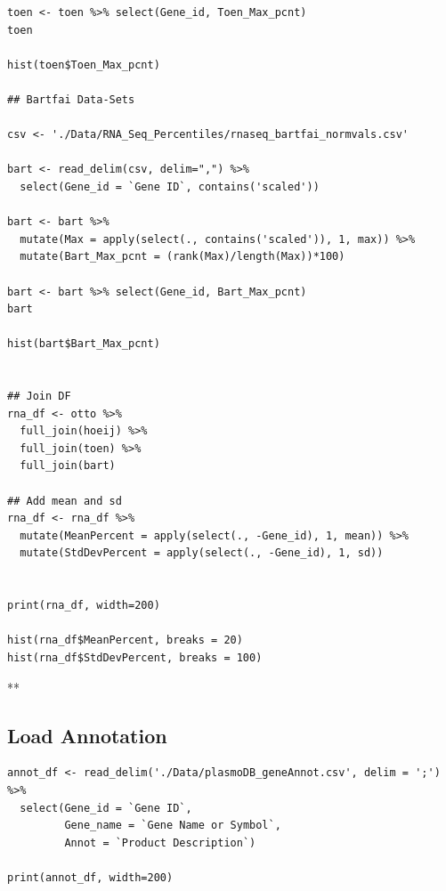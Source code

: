 \documentclass[11pt]{article}
\begin{document}
\begin{verbatim}
toen <- toen %>% select(Gene_id, Toen_Max_pcnt)
toen

hist(toen$Toen_Max_pcnt)

## Bartfai Data-Sets

csv <- './Data/RNA_Seq_Percentiles/rnaseq_bartfai_normvals.csv'

bart <- read_delim(csv, delim=",") %>%
  select(Gene_id = `Gene ID`, contains('scaled'))

bart <- bart %>%
  mutate(Max = apply(select(., contains('scaled')), 1, max)) %>%
  mutate(Bart_Max_pcnt = (rank(Max)/length(Max))*100)

bart <- bart %>% select(Gene_id, Bart_Max_pcnt)
bart

hist(bart$Bart_Max_pcnt)


## Join DF
rna_df <- otto %>%
  full_join(hoeij) %>%
  full_join(toen) %>%
  full_join(bart)

## Add mean and sd
rna_df <- rna_df %>%
  mutate(MeanPercent = apply(select(., -Gene_id), 1, mean)) %>%
  mutate(StdDevPercent = apply(select(., -Gene_id), 1, sd))


print(rna_df, width=200)

hist(rna_df$MeanPercent, breaks = 20)
hist(rna_df$StdDevPercent, breaks = 100)
\end{verbatim}
**
\subsection{Load Annotation}
\label{sec:org905fb5c}
\begin{verbatim}
annot_df <- read_delim('./Data/plasmoDB_geneAnnot.csv', delim = ';') %>%
  select(Gene_id = `Gene ID`,
         Gene_name = `Gene Name or Symbol`,
         Annot = `Product Description`)

print(annot_df, width=200)
\end{verbatim}
\end{document}
